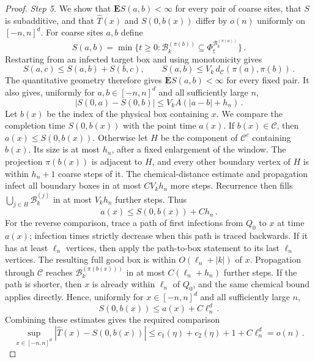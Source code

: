 \documentclass[12pt]{amsart}
\begin{document}
\begin{proof}
\emph{Step 5.} We show that $\mathbf E S(a,b)<\infty$ for every pair of coarse sites, that $S$ is subadditive, and that $\hat T(x)$ and $S(0,b(x))$ differ by $o(n)$ uniformly on $[-n,n]^d$. For coarse sites $a,b$ define
\begin{equation*}
 S(a,b)=\min\{t\geq0:
             \mathcal B^{(\pi(b))}_k\subseteq\Phi_t^{\mathcal B^{(\pi(a))}_k}\}\,.
\end{equation*}
Restarting from an infected target box and using monotonicity gives
\begin{equation*}
 S(a,c)\leq S(a,b)+S(b,c),\qquad
 S(a,b)\leq V_k\,d_{\mathcal C}(\pi(a),\pi(b))\,.
\end{equation*}
The quantitative geometry therefore gives $\mathbf E S(a,b)<\infty$ for every fixed pair. It also gives, uniformly for $a,b\in[-n,n]^d$ and all sufficiently large $n$,
\begin{equation*}
 |S(0,a)-S(0,b)|\leq V_kA(|a-b|+h_n)\,.
\end{equation*}
Let $b(x)$ be the index of the physical box containing $x$. We compare the completion time $S(0,b(x))$ with the point time $a(x)$. If $b(x)\in\mathcal C$, then $a(x)\leq S(0,b(x))$. Otherwise let $H$ be the component of $\mathcal C^c$ containing $b(x)$. Its size is at most $h_n$, after a fixed enlargement of the window. The projection $\pi(b(x))$ is adjacent to $H$, and every other boundary vertex of $H$ is within $h_n+1$ coarse steps of it. The chemical-distance estimate and propagation infect all boundary boxes in at most $CV_kh_n$ more steps. Recurrence then fills $\bigcup_{j\in H}\mathcal B^{(j)}_k$ in at most $V_kh_n$ further steps. Thus
\begin{equation*}
 a(x)\leq S(0,b(x))+Ch_n\,.
\end{equation*}
For the reverse comparison, trace a path of first infections from $Q_0$ to $x$ at time $a(x)$; infection times strictly decrease when this path is traced backwards. If it has at least $\ell_n$ vertices, then apply the path-to-box statement to its last $\ell_n$ vertices. The resulting full good box is within $O(\ell_n+|k|)$ of $x$. Propagation through $\mathcal C$ reaches $\mathcal B^{(\pi(b(x)))}_k$ in at most $C(\ell_n+h_n)$ further steps. If the path is shorter, then $x$ is already within $\ell_n$ of $Q_0$, and the same chemical bound applies directly. Hence, uniformly for $x\in[-n,n]^d$ and all sufficiently large $n$,
\begin{equation*}
 S(0,b(x))\leq a(x)+C\ell_n^d\,.
\end{equation*}
Combining these estimates gives the required comparison
\begin{equation*}
 \sup_{x\in[-n,n]^d}
 |\hat T(x)-S(0,b(x))|
 \leq c_1(\eta)+c_2(\eta)+1+C\ell_n^d=o(n)\,.
\end{equation*}


\end{proof}
\end{document}
